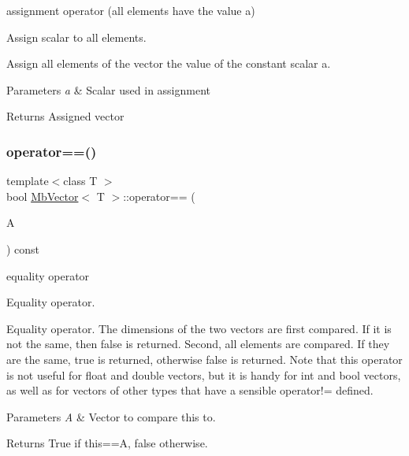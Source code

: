 assignment operator (all elements have the value a) 

Assign scalar to all elements.

Assign all elements of the vector the value of the constant scalar a.


\begin{DoxyParams}{Parameters}
{\em a} & Scalar used in assignment \\
\hline
\end{DoxyParams}
\begin{DoxyReturn}{Returns}
Assigned vector 
\end{DoxyReturn}
\mbox{\label{class_mb_vector_a8f2620606cadfa0e0ba937fd4725ac3c}} 
\subsubsection{\texorpdfstring{operator==()}{operator==()}}
{\footnotesize\ttfamily template$<$class T $>$ \\
bool \mbox{\hyperlink{class_mb_vector}{Mb\+Vector}}$<$ T $>$\+::operator== (\begin{DoxyParamCaption}\item[{const \mbox{\hyperlink{class_mb_vector}{Mb\+Vector}}$<$ T $>$ \&}]{A }\end{DoxyParamCaption}) const}



equality operator 

Equality operator.

Equality operator. The dimensions of the two vectors are first compared. If it is not the same, then false is returned. Second, all elements are compared. If they are the same, true is returned, otherwise false is returned. Note that this operator is not useful for float and double vectors, but it is handy for int and bool vectors, as well as for vectors of other types that have a sensible operator!= defined.


\begin{DoxyParams}{Parameters}
{\em A} & Vector to compare this to. \\
\hline
\end{DoxyParams}
\begin{DoxyReturn}{Returns}
True if this==A, false otherwise. 
\end{DoxyReturn}
\mbox{\label{class_mb_vector_af32339427953f6173daeb55a47098907}} 
